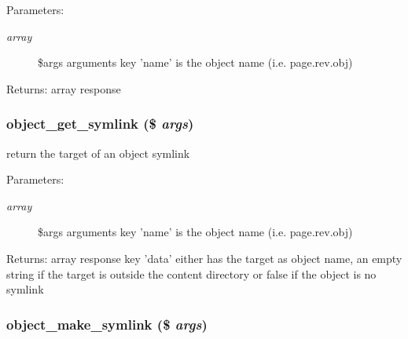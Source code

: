 \begin{Desc}
\item[Parameters:]
\begin{description}
\item[{\em array}]\$args arguments key 'name' is the object name (i.e. page.rev.obj) \end{description}
\end{Desc}
\begin{Desc}
\item[Returns:]array response \end{Desc}
\hypertarget{module__glue_8inc_8php_a9618d306b7ee5bd9e5d6a0be268ed44}{
\subsubsection[{object\_\-get\_\-symlink}]{\setlength{\rightskip}{0pt plus 5cm}object\_\-get\_\-symlink (\$ {\em args})}}
\label{module__glue_8inc_8php_a9618d306b7ee5bd9e5d6a0be268ed44}


return the target of an object symlink

\begin{Desc}
\item[Parameters:]
\begin{description}
\item[{\em array}]\$args arguments key 'name' is the object name (i.e. page.rev.obj) \end{description}
\end{Desc}
\begin{Desc}
\item[Returns:]array response key 'data' either has the target as object name, an empty string if the target is outside the content directory or false if the object is no symlink \end{Desc}
\hypertarget{module__glue_8inc_8php_14e6da411df5aa9ff38e2d4ea27dd077}{
\subsubsection[{object\_\-make\_\-symlink}]{\setlength{\rightskip}{0pt plus 5cm}object\_\-make\_\-symlink (\$ {\em args})}}
\label{module__glue_8inc_8php_14e6da411df5aa9ff38e2d4ea27dd077}


